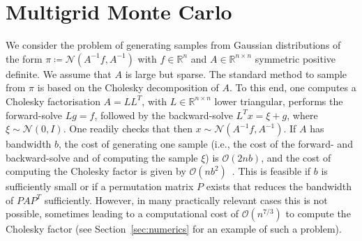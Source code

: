 \documentclass[
fontsize=11pt,
paper=a4,
numbers=noenddot
]{scrartcl}
\begin{document}
\section{Multigrid Monte Carlo}
We consider the problem of generating samples from Gaussian distributions of the form $\pi\coloneqq\mathcal{N}(A^{-1}f, A^{-1})$ with $f \in \mathbb{R}^n$ and $A \in \mathbb{R}^{n \times n}$ symmetric positive definite. We assume that $A$ is large but sparse.
The standard method to sample from $\pi$ is based on the Cholesky decomposition of $A$. To this end, one computes a Cholesky factorisation $A = LL^T$, with $L \in \mathbb{R}^{n \times n}$ lower triangular, performs the forward-solve $L g = f$, followed by the backward-solve $L^T x = \xi + g$, where $\xi \sim \mathcal{N}(0,I)$. One readily checks that then $x \sim \mathcal{N}(A^{-1}f, A^{-1})$. If $A$ has bandwidth $b$, the cost of generating one sample (i.e., the cost of the forward- and backward-solve and of computing the sample $\xi$) is $\mathcal{O}(2nb)$, and the cost of computing the Cholesky factor is given by $\mathcal{O}(nb^2)$~\cite{golubvanloan}. This is feasible if $b$ is sufficiently small or if a permutation matrix $P$ exists that reduces the bandwidth of $PAP^T$ sufficiently. However, in many practically relevant cases this is not possible, sometimes leading to a computational cost of $\mathcal{O}(n^{7/3})$ to compute the Cholesky factor (see Section~\ref{sec:numerics} for an example of such a problem). 

\end{document}
